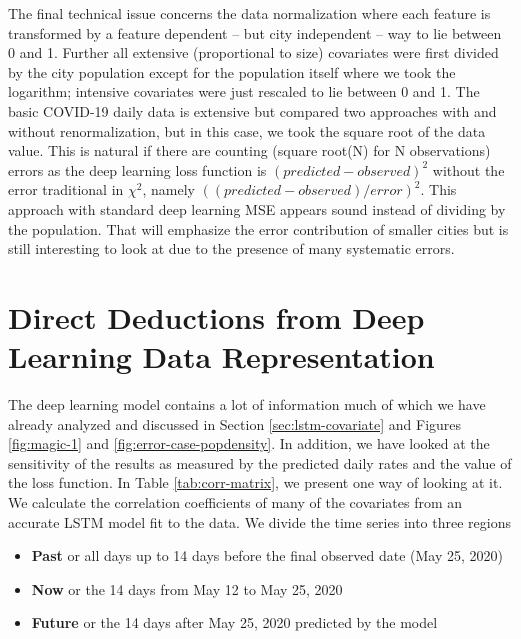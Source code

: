 \documentclass[letterpaper, inpress]{jds} %
\renewcommand{\_}{%
    \textunderscore\hspace{0pt}%
}
\begin{document}
The final technical issue concerns the data normalization where each
feature is transformed by a feature dependent -- but city independent
-- way to lie between 0 and 1. Further all extensive (proportional to
size) covariates were first divided by the city population except for
the population itself where we took the logarithm; intensive
covariates were just rescaled to lie between 0 and 1. The basic
COVID-19 daily data is extensive but compared two approaches with and
without renormalization, but in this case, we took the square root of
the data value.  This is natural if there are counting (square root(N)
for N observations) errors as the deep learning loss function is
$(predicted-observed)^{2}$ without the error traditional in
$\chi^{2}$, namely $((predicted-observed)/error)^{2}$. This approach
with standard deep learning MSE appears sound instead of dividing by
the population. That will emphasize the error contribution of smaller
cities but is still interesting to look at due to the presence of many
systematic errors.


\section{Direct Deductions from Deep Learning Data Representation}

The deep learning model contains a lot of information much of which we
have already analyzed and discussed in Section
\ref{sec:lstm-covariate} and Figures \ref{fig:magic-1} and
\ref{fig:error-case-popdensity}. In addition, we have looked at the
sensitivity of the results as measured by the predicted daily rates
and the value of the loss function. In Table \ref{tab:corr-matrix}, we
present one way of looking at it. We calculate the correlation
coefficients of many of the covariates from an accurate LSTM model fit
to the data. We divide the time series into three regions

\begin{itemize}
\item \textbf{Past} or all days up to 14 days before the final
  observed date (May 25, 2020)
\item \textbf{Now} or the 14 days from May 12 to May 25, 2020
\item \textbf{Future} or the 14 days after May 25, 2020 predicted by
  the model
\end{itemize}
 
\end{document}

